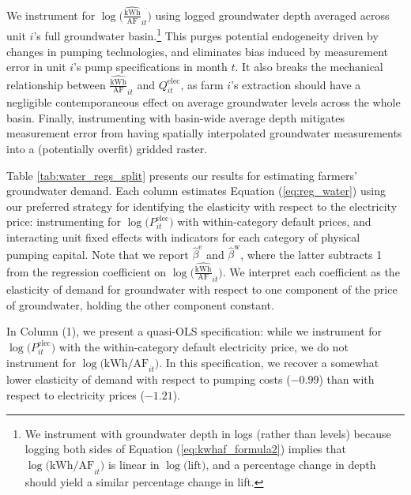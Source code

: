 We instrument for $\log\big(\widehat{\tfrac{{\text{kWh}}}{\text{AF}}}_{it}\big)$ using logged groundwater depth averaged across unit $i$'s full groundwater basin.\footnote{
We instrument with groundwater depth in logs (rather than levels) because logging both sides of Equation (\ref{eq:kwhaf_formula2}) implies that $\log\big({{\text{kWh}}\big/{\text{AF}}}_{it}\big)$ is linear in $\log\big(\text{lift}\big)$, and a percentage change in depth should yield a similar percentage change in lift.
} This purges potential endogeneity driven by changes in pumping technologies, and eliminates bias induced by measurement error in unit $i$'s pump specifications in month $t$. It also breaks the mechanical relationship between $\widehat{\tfrac{{\text{kWh}}}{\text{AF}}}_{it}$ and $Q^{\text{elec}}_{it}$, as farm $i$'s extraction should have a negligible contemporaneous effect on average groundwater levels across the whole basin. Finally, instrumenting with basin-wide average depth mitigates measurement error from having spatially interpolated groundwater measurements into a (potentially overfit) gridded raster.


Table \ref{tab:water_regs_split} presents our results for estimating farmers' groundwater demand. Each column estimates Equation (\ref{eq:reg_water}) using our preferred strategy for identifying the elasticity with respect to the electricity price: instrumenting for $\log\big(P_{it}^{\text{elec}}\big)$ with within-category default prices, and interacting unit fixed effects with indicators for each category of physical pumping capital. Note that we report $\hat\beta^{\text{e}}$ and $\hat\beta^{\text{w}}$, where the latter subtracts 1 from the regression coefficient on $\log\big(\widehat{\tfrac{{\text{kWh}}}{\text{AF}}}_{it}\big)$. We interpret each coefficient as the elasticity of demand for groundwater with respect to one component of the price of groundwater, holding the other component constant.

In Column (1), we present a quasi-OLS specification: while we instrument for $\log\big(P_{it}^{\text{elec}}\big)$ with the within-category default electricity price, we do not instrument for $\log\big({{\text{kWh}}\big/{\text{AF}}}_{it}\big)$. In this specification, we recover a somewhat lower elasticity of demand with respect to pumping costs ($-0.99$) than with respect to electricity prices ($-1.21$).

